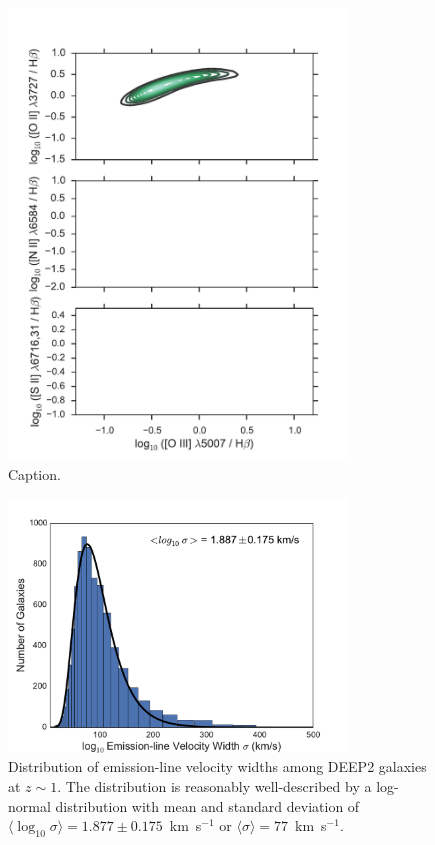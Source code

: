 \documentclass[11pt]{article}
\newcommand{\oiilam}{[O~{\sc ii}]~\ensuremath{\lambda\lambda3726,29}}
\newcommand{\kms}{km~s$^{-1}$}
\begin{document}
\begin{figure}
\centering
\includegraphics[width=0.8\textwidth]{figures/oiiihb.pdf}
\caption{Caption. \label{fig:oiiihb}}
\end{figure}


\begin{figure}
\centering
\includegraphics[width=0.8\textwidth]{figures/linesigma.pdf}
\caption{Distribution of emission-line velocity widths among DEEP2 galaxies at
  $z\sim1$.  The distribution is reasonably well-described by a log-normal
  distribution with mean and standard deviation of
  $\langle\log_{10}\sigma\rangle=1.877\pm0.175$~\kms{} or
  $\langle\sigma\rangle=77$~\kms.  \label{fig:linesigma}}
\end{figure}
\end{document}
